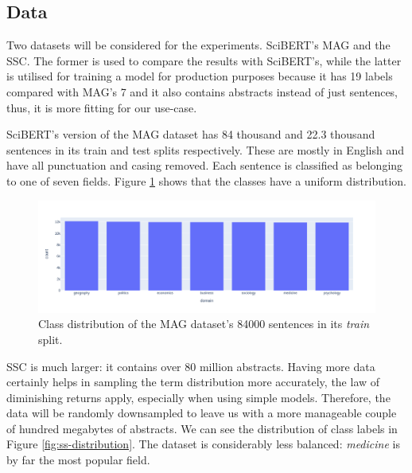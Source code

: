 \subsection{Data}

Two datasets will be considered for the experiments. SciBERT's MAG and the SSC. The former is used to compare the results with SciBERT's, while the latter is utilised for training a model for production purposes because it has 19 labels compared with MAG's 7 and it also contains abstracts instead of just sentences, thus, it is more fitting for our use-case.

SciBERT's version of the MAG dataset has 84 thousand and 22.3 thousand sentences in its train and test splits respectively. These are mostly in English and have all punctuation and casing removed. Each sentence is classified as belonging to one of seven fields. Figure \ref{fig:mag-distribtion} shows that the classes have a uniform distribution. 

\begin{figure}
    \centering
    \includegraphics[width=\linewidth]{figures/mag-distribution.png}
    \caption{Class distribution of the MAG  \cite{wang2019review} dataset's 84000 sentences in its \textit{train} split.}
    \label{fig:mag-distribtion}
\end{figure}

SSC is much larger: it contains over 80 million abstracts. Having more data certainly helps in sampling the term distribution more accurately, the law of diminishing returns apply, especially when using simple models. Therefore, the data will be randomly downsampled to leave us with a more manageable couple of hundred megabytes of abstracts. We can see the distribution of class labels in Figure \ref{fig:ss-distribution}. The dataset is considerably less balanced: \textit{medicine} is by far the most popular field.

